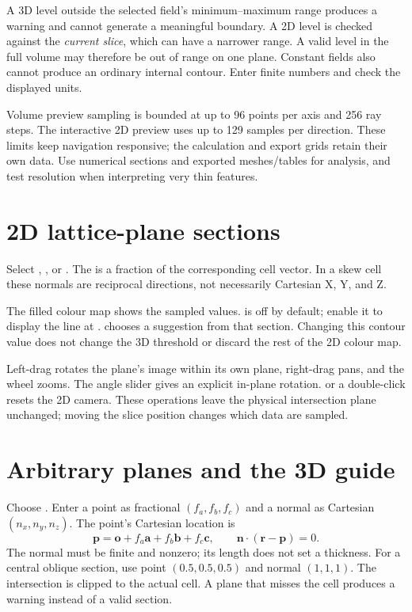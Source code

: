 A 3D level outside the selected field's minimum--maximum range produces a warning and cannot generate a meaningful boundary. A 2D level is checked against the \emph{current slice}, which can have a narrower range. A valid level in the full volume may therefore be out of range on one plane. Constant fields also cannot produce an ordinary internal contour. Enter finite numbers and check the displayed units.

Volume preview sampling is bounded at up to 96 points per axis and 256 ray steps. The interactive 2D preview uses up to 129 samples per direction. These limits keep navigation responsive; the calculation and export grids retain their own data. Use numerical sections and exported meshes/tables for analysis, and test resolution when interpreting very thin features.

\section{2D lattice-plane sections}
Select , , or . The  is a fraction of the corresponding cell vector. In a skew cell these normals are reciprocal directions, not necessarily Cartesian X, Y, and Z.

The filled colour map shows the sampled values.  is off by default; enable it to display the line at .  chooses a suggestion from that section. Changing this contour value does not change the 3D threshold or discard the rest of the 2D colour map.

Left-drag rotates the plane's image within its own plane, right-drag pans, and the wheel zooms. The angle slider gives an explicit in-plane rotation.  or a double-click resets the 2D camera. These operations leave the physical intersection plane unchanged; moving the slice position changes which data are sampled.

\section{Arbitrary planes and the 3D guide}
Choose . Enter a point as fractional $(f_a,f_b,f_c)$ and a normal as Cartesian $(n_x,n_y,n_z)$. The point's Cartesian location is
\[
\mathbf p=\mathbf o+f_a\mathbf a+f_b\mathbf b+f_c\mathbf c,
\qquad \mathbf n\cdot(\mathbf r-\mathbf p)=0.
\]
The normal must be finite and nonzero; its length does not set a thickness. For a central oblique section, use point $(0.5,0.5,0.5)$ and normal $(1,1,1)$. The intersection is clipped to the actual cell. A plane that misses the cell produces a warning instead of a valid section.

